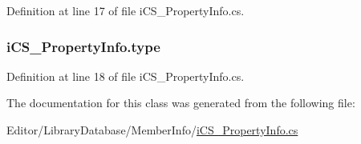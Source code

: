 Definition at line 17 of file i\+C\+S\+\_\+\+Property\+Info.\+cs.

\hypertarget{classi_c_s___property_info_ad60cbf8b8f861185931d302037a3e4cf}{
\subsubsection[{type}]{ i\+C\+S\+\_\+\+Property\+Info.\+type\hspace{0.3cm}{\ttfamily [get]}}}\label{classi_c_s___property_info_ad60cbf8b8f861185931d302037a3e4cf}


Definition at line 18 of file i\+C\+S\+\_\+\+Property\+Info.\+cs.



The documentation for this class was generated from the following file\+:\begin{DoxyCompactItemize}
\item 
Editor/\+Library\+Database/\+Member\+Info/\hyperlink{i_c_s___property_info_8cs}{i\+C\+S\+\_\+\+Property\+Info.\+cs}\end{DoxyCompactItemize}
